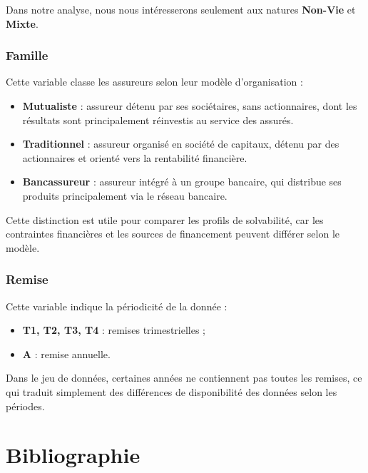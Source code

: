 \documentclass[
]{article}
\providecommand{\tightlist}{%
  \setlength{\itemsep}{0pt}\setlength{\parskip}{0pt}}
\begin{document}
Dans notre analyse, nous nous intéresserons seulement aux natures
\textbf{Non-Vie} et \textbf{Mixte}.

\subsubsection{Famille}\label{famille}

Cette variable classe les assureurs selon leur modèle d'organisation :

\begin{itemize}
\tightlist
\item
  \textbf{Mutualiste} : assureur détenu par ses sociétaires, sans
  actionnaires, dont les résultats sont principalement réinvestis au
  service des assurés.
\item
  \textbf{Traditionnel} : assureur organisé en société de capitaux,
  détenu par des actionnaires et orienté vers la rentabilité financière.
\item
  \textbf{Bancassureur} : assureur intégré à un groupe bancaire, qui
  distribue ses produits principalement via le réseau bancaire.
\end{itemize}

Cette distinction est utile pour comparer les profils de solvabilité,
car les contraintes financières et les sources de financement peuvent
différer selon le modèle.

\subsubsection{Remise}\label{remise}

Cette variable indique la périodicité de la donnée :

\begin{itemize}
\tightlist
\item
  \textbf{T1, T2, T3, T4} : remises trimestrielles ;
\item
  \textbf{A} : remise annuelle.
\end{itemize}

Dans le jeu de données, certaines années ne contiennent pas toutes les
remises, ce qui traduit simplement des différences de disponibilité des
données selon les périodes.

\newpage

\section{Bibliographie}\label{bibliographie}
\end{document}
